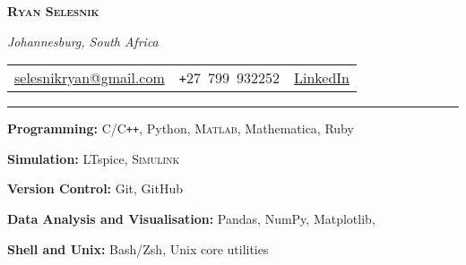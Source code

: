 \documentclass[10pt, a4paper]{article}
\newcommand{\heading}[1]{
\makebox[0pt][l]{\Large \sc \hspace{2pt}#1}
\rule[-0.7ex]{\columnwidth}{0.5pt}\vspace{1.0ex}
}
\newcommand{\generalInfoSkip}{\vspace{0.3ex}}
\newenvironment{mysection}[1]
{\vspace{2.5ex}
\heading{#1}
\begin{adjustwidth}{0.3cm}{0cm}}
{\end{adjustwidth} }
\begin{document}
\begin{center}
\textsc{\textbf{\huge Ryan Selesnik}}

\vspace{.2em}
\footnotesize{\textit{Johannesburg, South Africa}}
\\
\vspace{.25em}
\centering
\footnotesize{
\begin{tabular}{c|c|c}

 \href{mailto:selesnikryan@gmail.com}{selesnikryan@gmail.com}     &  \texttt{+}27~799~932252  & \href{https://www.linkedin.com/in/ryan-s-09850613b/}{LinkedIn} 
    
\end{tabular}}

\end{center}

\begin{mysection}{Skills}
    \textbf{Programming:} C/C\texttt{++}, Python, \textsc{Matlab}, Mathematica, Ruby

    \generalInfoSkip
    \textbf{Simulation:} LTspice, \textsc{Simulink}

    \generalInfoSkip
    \textbf{Version Control:} Git, GitHub

    \generalInfoSkip
    \textbf{Data Analysis and Visualisation:} Pandas, NumPy, Matplotlib, 

    \generalInfoSkip
    \textbf{Shell and Unix:} Bash/Zsh, Unix core utilities

\end{mysection}
\end{document}
